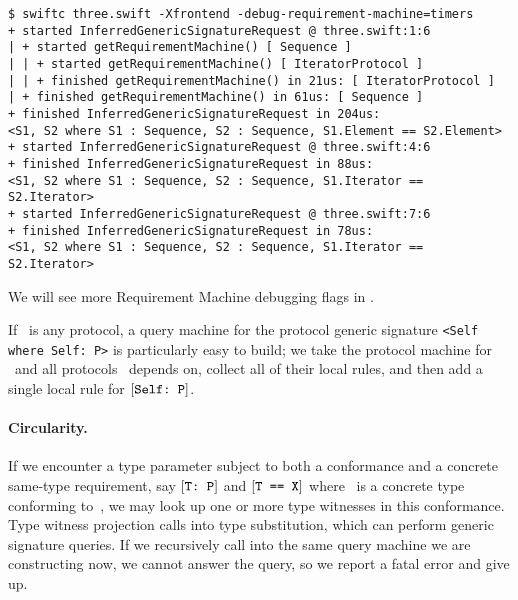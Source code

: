 \documentclass[../generics]{subfiles}
\begin{document}
\begin{example}
\begin{Verbatim}[fontsize=\footnotesize,numbers=none]
$ swiftc three.swift -Xfrontend -debug-requirement-machine=timers
+ started InferredGenericSignatureRequest @ three.swift:1:6
| + started getRequirementMachine() [ Sequence ]
| | + started getRequirementMachine() [ IteratorProtocol ]
| | + finished getRequirementMachine() in 21us: [ IteratorProtocol ]
| + finished getRequirementMachine() in 61us: [ Sequence ]
+ finished InferredGenericSignatureRequest in 204us:
<S1, S2 where S1 : Sequence, S2 : Sequence, S1.Element == S2.Element>
+ started InferredGenericSignatureRequest @ three.swift:4:6
+ finished InferredGenericSignatureRequest in 88us:
<S1, S2 where S1 : Sequence, S2 : Sequence, S1.Iterator == S2.Iterator>
+ started InferredGenericSignatureRequest @ three.swift:7:6
+ finished InferredGenericSignatureRequest in 78us:
<S1, S2 where S1 : Sequence, S2 : Sequence, S1.Iterator == S2.Iterator>
\end{Verbatim}
We will see more Requirement Machine debugging flags in .
\end{example}

\begin{example}
If \tP\ is any protocol, a query machine for the protocol generic signature \verb|<Self where Self: P>| is particularly easy to build; we take the protocol machine for \tP\ and all protocols \tP\ depends on, collect all of their local rules, and then add a single local rule for $[\texttt{Self:~P}]$.
\end{example}

\paragraph{Circularity.}
If we encounter a type parameter subject to both a conformance and a concrete same-type requirement, say $[\texttt{T:~P}]$ and $[\texttt{T == X}]$ where \tX\ is a concrete type conforming to~\tP, we may look up one or more type witnesses in this conformance. Type witness projection calls into type substitution, which can perform generic signature queries. If we recursively call into the same query machine we are constructing now, we cannot answer the query, so we report a fatal error and give up.
\end{document}
